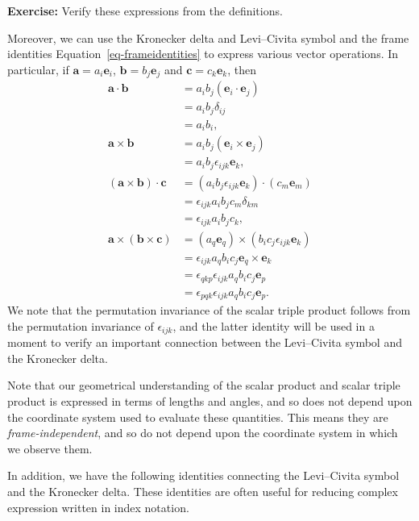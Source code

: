 \documentclass[
  letterpaper,
  DIV=11,
  numbers=noendperiod]{scrreprt}
\theoremstyle{plain}
\theoremstyle{remark}
\begin{document}
\textbf{Exercise:} Verify these expressions from the definitions.

Moreover, we can use the Kronecker delta and Levi--Civita symbol and the
frame identities Equation~\ref{eq-frameidentities} to express various
vector operations. In particular, if
\({\boldsymbol{a}}= a_i{\boldsymbol{e}}_i\),
\({\boldsymbol{b}}= b_j{\boldsymbol{e}}_j\) and
\({\boldsymbol{c}}= c_k{\boldsymbol{e}}_k\), then \[\begin{aligned}
    {\boldsymbol{a}}\cdot{\boldsymbol{b}}&= a_ib_j({\boldsymbol{e}}_i \cdot {\boldsymbol{e}}_j)\\ &= a_ib_j\delta_{ij} \\&= a_ib_i,\\
  {\boldsymbol{a}}\times{\boldsymbol{b}}&= a_ib_j({\boldsymbol{e}}_i \times {\boldsymbol{e}}_j) \\&= a_ib_j\epsilon_{ijk}{\boldsymbol{e}}_k,\\
  ({\boldsymbol{a}}\times{\boldsymbol{b}})\cdot{\boldsymbol{c}}&= (a_ib_j\epsilon_{ijk}{\boldsymbol{e}}_k)\cdot(c_m{\boldsymbol{e}}_m) \\&= \epsilon_{ijk}a_ib_jc_m\delta_{km} \\&= \epsilon_{ijk}a_ib_jc_k,\\
  {\boldsymbol{a}}\times({\boldsymbol{b}}\times{\boldsymbol{c}}) &= (a_q{\boldsymbol{e}}_q)\times(b_ic_j\epsilon_{ijk}{\boldsymbol{e}}_k)\\ &= \epsilon_{ijk}a_qb_ic_j{\boldsymbol{e}}_q\times{\boldsymbol{e}}_k\\ &= \epsilon_{qkp}\epsilon_{ijk}a_qb_ic_j{\boldsymbol{e}}_p\\ &= \epsilon_{pqk}\epsilon_{ijk}a_qb_ic_j{\boldsymbol{e}}_p.
\end{aligned}\] We note that the permutation invariance of the scalar
triple product follows from the permutation invariance of
\(\epsilon_{ijk}\), and the latter identity will be used in a moment to
verify an important connection between the Levi--Civita symbol and the
Kronecker delta.

Note that our geometrical understanding of the scalar product and scalar
triple product is expressed in terms of lengths and angles, and so does
not depend upon the coordinate system used to evaluate these quantities.
This means they are \emph{frame-independent}, and so do not depend upon
the coordinate system in which we observe them.

In addition, we have the following identities connecting the
Levi--Civita symbol and the Kronecker delta. These identities are often
useful for reducing complex expression written in index notation.
\end{document}
